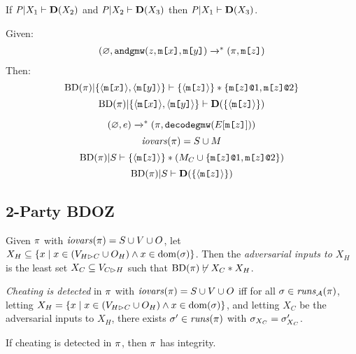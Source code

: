 \begin{lemma}
  If $\condp{\pmf}{X_1}{\detx{X_2}}$ and
  $\condp{\pmf}{X_2}{\detx{X_3}}$ then $\condp{\pmf}{X_1}{\detx{X_3}}$.
\end{lemma}

\begin{lemma}
  Given:
  $$
  \begin{array}{c}
  (\varnothing,\andgmw(z,\mesg{x},\mesg{y}) \redxs %
  (\prog,\mesg{z})
  \end{array}
  $$
  Then:
  $$
  \condsep
      {\progtt(\prog)}
      {\{ \macgv{\mesg{x}},\macgv{\mesg{y}} \}}
      {\{ \macgv{\mesg{z}} \}}
      {\{ \elab{\mesg{z}}{1},\elab{\mesg{z}}{2} \}}
  $$
  $$
  \conddetx{\progtt(\prog)}{\{ \macgv{\mesg{x}},\macgv{\mesg{y}} \}}{\{ \macgv{\mesg{z}} \}}    
  $$
\end{lemma}

\begin{lemma}
  $$ (\varnothing,e) \redxs (\prog,\decodegmw(E[\mesg{z}])) $$
  $$\iov(\prog) = S \cup M$$
  $$\condsep{\progtt(\prog)}{S}{\{\macgv{\mesg{z}}\}}{(M_C \cup \{ \elab{\mesg{z}}{1}, \elab{\mesg{z}}{2} \})}$$
  $$\conddetx{\progtt(\prog)}{S}{\{\macgv{\mesg{z}}\}}$$
\end{lemma}

\begin{mathpar}
  
  
\end{mathpar}

\subsection{2-Party BDOZ}



\begin{definition}
  Given $\prog$ with $\iov(\prog) = S \cup V \cup O$,
  let $X_H \subseteq \{ x \mid x \in (\houtputs \cup O_H) \wedge x \in \dom(\store) \}$.
  Then the \emph{adversarial inputs to $X_H$} is the least set
  $X_C \subseteq \cinputs$ such that $\progtt(\prog) \not\vdash X_C * X_H$.
\end{definition}
\begin{definition}
  \emph{Cheating is detected} in $\prog$ with $\iov(\prog) = S \cup V \cup O$ iff
  for all  $\store \in \aruns(\prog)$,
  letting $X_H = \{ x \mid x \in (\houtputs \cup O_H) \wedge x \in \dom(\store) \}$,
  and letting $X_C$ be the adversarial inputs to $X_H$,
  there exists $\sigma'\in \runs(\prog)$
  with $\store_{X_C} = \store'_{X_C}$.  
\end{definition}

\begin{lemma}
  If cheating is detected in $\prog$, then $\prog$ has integrity.
\end{lemma}
